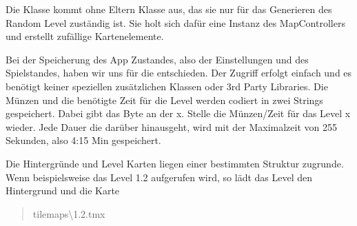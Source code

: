 Die Klasse  kommt ohne Eltern Klasse aus, das sie nur für das Generieren des Random Level zuständig ist. Sie holt sich dafür eine Instanz des MapControllers und erstellt zufällige Kartenelemente.



\label{sec:3_Speichersystem}

Bei der Speicherung des App Zustandes, also der Einstellungen und des Spielstandes, haben wir uns für die  entschieden. Der Zugriff erfolgt einfach und es benötigt keiner speziellen zusätzlichen Klassen oder 3rd Party Libraries. Die Münzen und die benötigte Zeit für die Level werden codiert in zwei Strings gespeichert. Dabei gibt das Byte an der x. Stelle die Münzen/Zeit für das Level x wieder. Jede Dauer die darüber hinausgeht, wird mit der Maximalzeit von 255 Sekunden, also 4:15 Min gespeichert.

Die Hintergründe und Level Karten liegen einer bestimmten Struktur zugrunde. Wenn beispielsweise das Level 1.2 aufgerufen wird, so lädt das Level den Hintergrund  und die Karte \blockquote{tilemaps\textbackslash 1.2.tmx}.
